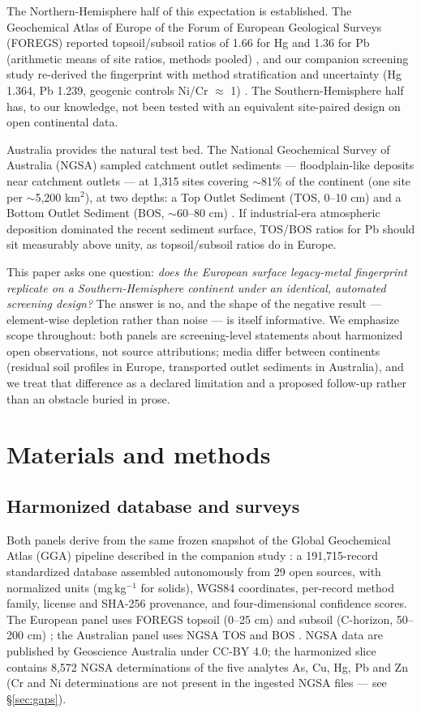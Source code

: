 \documentclass[11pt]{article}
\begin{document}
The Northern-Hemisphere half of this expectation is established. The
Geochemical Atlas of Europe of the Forum of European Geological Surveys
(FOREGS) \cite{salminen2005} reported topsoil/subsoil ratios of 1.66 for Hg
and 1.36 for Pb (arithmetic means of site ratios, methods pooled)
\cite{devos2006}, and our companion screening study re-derived the
fingerprint with method stratification and uncertainty (Hg 1.364, Pb 1.239,
geogenic controls Ni/Cr $\approx$ 1) \cite{gga2026a}. The
Southern-Hemisphere half has, to our knowledge, not been tested with an
equivalent site-paired design on open continental data.

Australia provides the natural test bed. The National Geochemical Survey of
Australia (NGSA) sampled catchment outlet sediments --- floodplain-like
deposits near catchment outlets --- at 1{,}315 sites covering $\sim$81\% of
the continent (one site per $\sim$5{,}200 km$^2$), at two depths: a Top
Outlet Sediment (TOS, 0--10 cm) and a Bottom Outlet Sediment (BOS,
$\sim$60--80 cm) \cite{decaritat2011,decaritat2016}. If industrial-era
atmospheric deposition dominated the recent sediment surface, TOS/BOS ratios
for Pb should sit measurably above unity, as topsoil/subsoil ratios do in
Europe.

This paper asks one question: \emph{does the European surface legacy-metal
fingerprint replicate on a Southern-Hemisphere continent under an identical,
automated screening design?} The answer is no, and the shape of the negative
result --- element-wise depletion rather than noise --- is itself
informative. We emphasize scope throughout: both panels are screening-level
statements about harmonized open observations, not source attributions;
media differ between continents (residual soil profiles in Europe,
transported outlet sediments in Australia), and we treat that difference as
a declared limitation and a proposed follow-up rather than an obstacle
buried in prose.

\section{Materials and methods}

\subsection{Harmonized database and surveys}
Both panels derive from the same frozen snapshot of the Global Geochemical
Atlas (GGA) pipeline described in the companion study \cite{gga2026a}: a
191{,}715-record standardized database assembled autonomously from 29 open
sources, with normalized units (mg\,kg$^{-1}$ for solids), WGS84
coordinates, per-record method family, license and SHA-256 provenance, and
four-dimensional confidence scores. The European panel uses FOREGS topsoil
(0--25 cm) and subsoil (C-horizon, 50--200 cm) \cite{salminen2005}; the
Australian panel uses NGSA TOS and BOS
\cite{decaritat2011}. NGSA data are published by Geoscience Australia under
CC-BY 4.0; the harmonized slice contains 8{,}572 NGSA determinations of the
five analytes As, Cu, Hg, Pb and Zn (Cr and Ni determinations are not
present in the ingested NGSA files --- see \S\ref{sec:gaps}).
\end{document}
